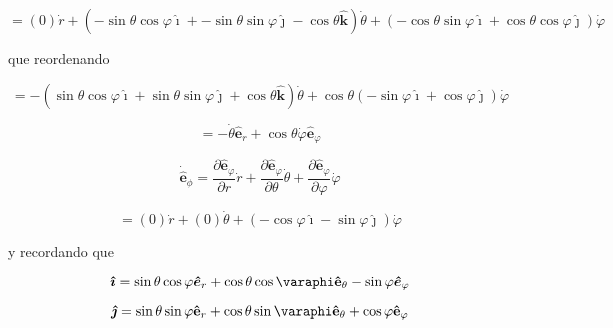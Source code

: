 \documentclass[12pt,a4paper]{article}
\begin{document}
\begin{enumerate}
      \begin{equation*}
          = (0) \dot{r} + (-\sin{\theta}\cos{\varphi} \boldsymbol{\hat{\imath}} + - \sin{\theta} \sin{\varphi} \boldsymbol{\hat{\jmath}} - \cos{\theta} \mathbf{\hat{k}}) \dot{\theta} + (-\cos{\theta}\sin{\varphi} \boldsymbol{\hat{\imath}} + \cos{\theta} \cos{\varphi} \boldsymbol{\hat{\jmath}}) \dot{\varphi}
      \end{equation*}
      
      que reordenando
      
      \begin{equation*}
          = -(\sin{\theta}\cos{\varphi} \boldsymbol{\hat{\imath}} + \sin{\theta} \sin{\varphi} \boldsymbol{\hat{\jmath}} + \cos{\theta} \mathbf{\hat{k}}) \dot{\theta} +\cos{\theta} (-\sin{\varphi} \boldsymbol{\hat{\imath}} + \cos{\varphi} \boldsymbol{\hat{\jmath}}) \dot{\varphi}
      \end{equation*}
      
      \begin{equation*}
          = - \dot{\theta} \hat{\mathbf{e}}_r + \cos{\theta} \dot{\varphi} \hat{\mathbf{e}}_\varphi
      \end{equation*}
      
      \begin{equation*}
          \dot{\mathbf{\hat{e}}}_\phi = \frac{\partial \hat{\mathbf{e}}_\varphi}{\partial r} \dot{r} + \frac{\partial \hat{\mathbf{e}}_\varphi}{\partial \theta} \dot{\theta} + \frac{\partial \hat{\mathbf{e}}_\varphi}{\partial \varphi} \dot{\varphi}
      \end{equation*}
      
      \begin{equation*}
          = (0) \dot{r} + (0) \dot{\theta} + (-\cos{\varphi} \boldsymbol{\hat{\imath}} - \sin{\varphi} \boldsymbol{\hat{\jmath}}) \dot{\varphi}
      \end{equation*}
      
      \newpage
      
      y recordando que
      
      \begin{equation*}
        \boldsymbol{\hat{\imath}} = \sin{\theta} \cos{\varphi} \boldsymbol{\hat{e}}_r + \cos{\theta} \cos{\varaphi} \mathbf{\hat{e}}_\theta - \sin{\varphi}\boldsymbol{\hat{e}}_\varphi
      \end{equation*}
      
      \begin{equation*}
          \boldsymbol{\hat{\jmath}} = \sin{\theta} \sin{\varphi} \mathbf{\hat{e}}_r + \cos{\theta} \sin{\varaphi} \mathbf{\hat{e}}_\theta + \cos{\varphi} \mathbf{\hat{e}}_\varphi 
      \end{equation*}
      

\end{enumerate}
\end{document}
